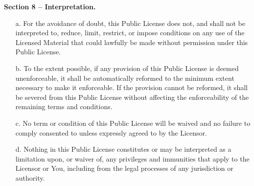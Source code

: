 \begin{center}
    \textbf{Section 8 -- Interpretation.}
\end{center}

\begin{itemize}
    \item[a.] For the avoidance of doubt, this Public License does not, and shall not be interpreted to, reduce, limit, restrict, or impose conditions on any use of the Licensed Material that could lawfully be made without permission under this Public License.

    \item[b.] To the extent possible, if any provision of this Public License is deemed unenforceable, it shall be automatically reformed to the minimum extent necessary to make it enforceable. If the provision cannot be reformed, it shall be severed from this Public License without affecting the enforceability of the remaining terms and conditions.

    \item[c.] No term or condition of this Public License will be waived and no failure to comply consented to unless expressly agreed to by the Licensor.

    \item[d.] Nothing in this Public License constitutes or may be interpreted as a limitation upon, or waiver of, any privileges and immunities that apply to the Licensor or You, including from the legal processes of any jurisdiction or authority.
\end{itemize}



